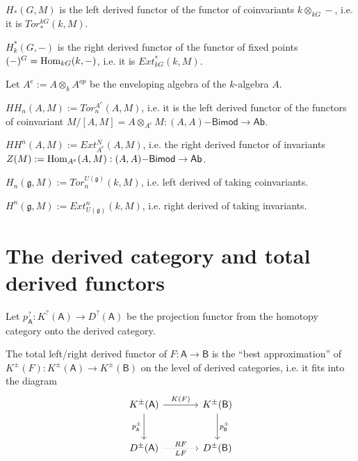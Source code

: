 \documentclass[fontsize=11pt,fleqn,a4paper]{scrartcl}
\begin{document}
\begin{example}
$H_\ast(G,M)$ is the left derived functor of the functor of coinvariants $k \otimes_{kG} -$, i.e. it is $Tor_\ast^{kG}(k,M)$.

$H_k^\ast(G,-)$ is the right derived functor of the functor of fixed points $(-)^G = \operatorname{Hom}_{kG}(k,-)$, i.e. it is $Ext_{kG}^\ast(k,M)$.
\end{example}

\begin{example}
Let $A^e := A\otimes_k A^{op}$ be the enveloping algebra of the $k$-algebra $A$.

$HH_n(A,M) := Tor_n^{A^e}(A,M)$, i.e. it is the left derived functor of the functors of coinvariant $M/[A,M] = A\otimes_{A^e} M: (A,A)\mathsf{-Bimod} \to \mathsf{Ab}$.

$HH^n(A,M) := Ext_{A^e}^N(A,M)$, i.e. the right derived functor of invariants $Z(M) := \operatorname{Hom}_{A^e}(A,M): (A,A)\mathsf{-Bimod} \to \mathsf{Ab}$.
\end{example}

\begin{example}
$H_n(\mathfrak{g},M) := Tor_n^{U(\mathfrak{g})}(k,M)$, i.e. left derived of taking coinvariants.

$H^n(\mathfrak{g},M) := Ext^n_{U(\mathfrak{g})}(k,M)$, i.e. right derived of taking invariants.
\end{example}

\section{The derived category and total derived functors}

\begin{theorem}
Let $p_\mathsf{A}^?: K^?(\mathsf{A}) \to D^?(\mathsf{A})$ be the projection functor from the homotopy category onto the derived category.

The total left/right derived functor of $F:\mathsf{A}\to\mathsf{B}$ is the \enquote{best approximation} of $K^\pm(F): K^\pm(\mathsf{A}) \to K^\pm(\mathsf{B})$ on the level of derived categories, i.e. it fits into the diagram
\[\begin{tikzcd}[sep = large]
K^{\pm}(\mathsf{A}) \ar[r,"K(F)"] \ar[d,"p_\mathsf{A}^\pm"'] & K^{\pm}(\mathsf{B}) \ar[d,"p_\mathsf{B}^\pm"] \\
D^\pm(\mathsf{A}) \ar[r,dotted,"LF"',"RF"] & D^\pm(\mathsf{B})
\end{tikzcd}\]
\end{theorem}
\end{document}

